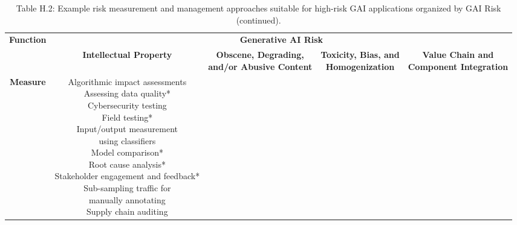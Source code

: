 \documentclass[fleqn]{article}
\begin{document}
\begin{landscape}
\vfill
\raisebox{-10pt}{\makebox[\linewidth]{\thepage}}

\pagebreak
\thispagestyle{empty}

\begin{table}[H]
	\caption*{Table H.2: Example risk measurement and management approaches suitable for high-risk GAI applications organized by GAI Risk (continued).}
	\footnotesize
	\begin{tabular}{|c|c|c|c|c|}
		\hline
		\multirow{2}{*}{\textbf{Function}} & \multicolumn{4}{|c|}{\textbf{Generative AI Risk}}   \\
		\cline{2-5}
		& \textbf{Intellectual Property} & \makecell[l]{\textbf{Obscene, Degrading,}\\\textbf{and/or Abusive Content}} & \makecell[l]{\textbf{Toxicity, Bias, and}\\\textbf{Homogenization}} & \makecell[l]{\textbf{Value Chain and}\\\textbf{Component Integration}} \\
		\hline		
		\textbf{Measure} 
		& \makecell[l]{
			\textbullet\hspace{3pt} Algorithmic impact assessments \\ 
			\textbullet\hspace{3pt} Assessing data quality*\\ 
			\textbullet\hspace{3pt} Cybersecurity testing \\ 
			\textbullet\hspace{3pt} Field testing*\\ 
			\textbullet\hspace{3pt} Input/output measurement\\\hspace{10pt}using classifiers \\  
			\textbullet\hspace{3pt} Model comparison*\\ 
			\textbullet\hspace{3pt} Root cause analysis*\\ 
			\textbullet\hspace{3pt} Stakeholder engagement and feedback*\\ 
			\textbullet\hspace{3pt} Sub-sampling traffic for\\\hspace{10pt}manually annotating \\ 
			\textbullet\hspace{3pt} Supply chain auditing \\ 
}
\end{tabular}
\end{table}
\end{landscape}
\end{document}

